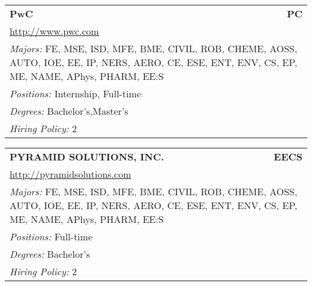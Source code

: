 \documentclass[twoside]{article}
\begin{document}
\begin{center}
\begin{multicols}{3}
\begin{FlushLeft}
\begin{minipage}{.9\columnwidth}
\end{minipage}
 
\begin{minipage}{.9\columnwidth}\begin{tabularx}{.95\columnwidth}{Xr}
                 {\Large\bf PwC} & {\Large\bf PC}\\
    \multicolumn{2}{p{.95\columnwidth}}{\url{http://www.pwc.com}}\\
    \multicolumn{2}{p{.95\columnwidth}}{\emph{Majors:} FE, MSE, ISD, MFE, BME, CIVIL, ROB, CHEME, AOSS, AUTO, IOE, EE, IP, NERS, AERO, CE, ESE, ENT, ENV, CS, EP, ME, NAME, APhys, PHARM, EE:S}\\
    \multicolumn{2}{p{.95\columnwidth}}{\emph{Positions:} Internship, Full-time}\\
    \multicolumn{2}{p{.95\columnwidth}}{\emph{Degrees:} Bachelor's,Master's}\\
    \multicolumn{2}{p{.95\columnwidth}}{\emph{Hiring Policy:} 2}\\
    \end{tabularx}
    
\end{minipage}
 
\begin{minipage}{.9\columnwidth}\begin{tabularx}{.95\columnwidth}{Xr}
                 {\Large\bf PYRAMID SOLUTIONS, INC.} & {\Large\bf EECS}\\
    \multicolumn{2}{p{.95\columnwidth}}{\url{http://pyramidsolutions.com}}\\
    \multicolumn{2}{p{.95\columnwidth}}{\emph{Majors:} FE, MSE, ISD, MFE, BME, CIVIL, ROB, CHEME, AOSS, AUTO, IOE, EE, IP, NERS, AERO, CE, ESE, ENT, ENV, CS, EP, ME, NAME, APhys, PHARM, EE:S}\\
    \multicolumn{2}{p{.95\columnwidth}}{\emph{Positions:} Full-time}\\
    \multicolumn{2}{p{.95\columnwidth}}{\emph{Degrees:} Bachelor's}\\
    \multicolumn{2}{p{.95\columnwidth}}{\emph{Hiring Policy:} 2}\\
    \end{tabularx}
    
\end{minipage}
 

\end{FlushLeft}
\end{multicols}
\end{center}
\end{document}
